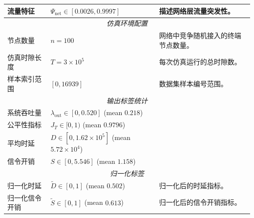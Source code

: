 \begin{table}[t]
\begin{tabular}{@{}p{2.7cm} p{6cm} p{6.5cm}@{}}
流量特征 
& $\Psi_{\text{net}}\in[0.0026,0.9997]$ 
& 描述网络层流量突发性。 \\

\midrule
\multicolumn{3}{c}{\textit{仿真环境配置}} \\

节点数量 
& $n=100$ 
& 网络中竞争随机接入的终端节点数量。 \\

仿真时隙长度 
& $T=3\times10^{5}$ 
& 每次仿真运行的总时隙数。 \\

样本索引范围 
& $[0,16939]$ 
& 数据集样本编号范围。 \\

\midrule
\multicolumn{3}{c}{\textit{输出标签统计}} \\

系统吞吐量 
& $\lambda_{\mathrm{out}}\in[0,0.520]$ \quad (mean $0.218$) 
&  \\


公平性指标 
& $J_T\in[0,1)$ \quad (mean $0.9796$) 
&  \\

平均时延 
& $D\in[0,1.62\times10^{5}]$ \quad (mean $5.72\times10^{4}$) 
&  \\

信令开销 
& $S\in[0,5.546]$ \quad (mean $1.158$) 
&  \\

\midrule
\multicolumn{3}{c}{\textit{归一化标签}} \\

归一化时延 
& $\tilde{D}\in[0,1]$ \quad (mean $0.502$) 
&归一化后的时延指标。 \\


归一化信令开销 
& $\tilde{S}\in[0,1]$ \quad (mean $0.613$) 
& 归一化后的信令开销指标。 \\

\bottomrule
\end{tabular}
\end{table}

